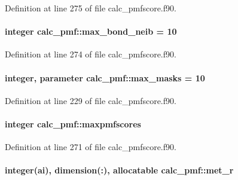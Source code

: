 Definition at line 275 of file calc\-\_\-pmfscore.\-f90.

\hypertarget{classcalc__pmf_a3ec37f70413f821e8521c6368ed69f24}{
\paragraph[{max\-\_\-bond\-\_\-neib}]{\setlength{\rightskip}{0pt plus 5cm}integer calc\-\_\-pmf\-::max\-\_\-bond\-\_\-neib = 10}}\label{classcalc__pmf_a3ec37f70413f821e8521c6368ed69f24}


Definition at line 274 of file calc\-\_\-pmfscore.\-f90.

\hypertarget{classcalc__pmf_acf38a9791fdd978de8bdec1e59e0b164}{
\paragraph[{max\-\_\-masks}]{\setlength{\rightskip}{0pt plus 5cm}integer, parameter calc\-\_\-pmf\-::max\-\_\-masks = 10}}\label{classcalc__pmf_acf38a9791fdd978de8bdec1e59e0b164}


Definition at line 229 of file calc\-\_\-pmfscore.\-f90.

\hypertarget{classcalc__pmf_ab0dd5e34df9ec5a11fc98c04b6a634de}{
\paragraph[{maxpmfscores}]{\setlength{\rightskip}{0pt plus 5cm}integer calc\-\_\-pmf\-::maxpmfscores}}\label{classcalc__pmf_ab0dd5e34df9ec5a11fc98c04b6a634de}


Definition at line 271 of file calc\-\_\-pmfscore.\-f90.

\hypertarget{classcalc__pmf_a66bc38a02eb1454e833ec9e65acc2b5c}{
\paragraph[{met\-\_\-r}]{\setlength{\rightskip}{0pt plus 5cm}integer(ai), dimension(\-:), allocatable calc\-\_\-pmf\-::met\-\_\-r}}\label{classcalc__pmf_a66bc38a02eb1454e833ec9e65acc2b5c}


